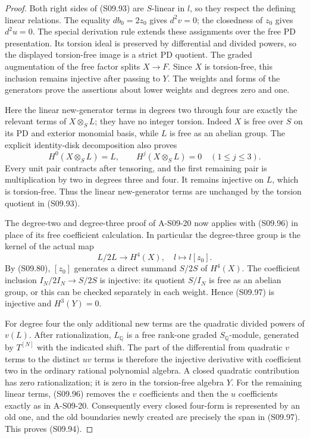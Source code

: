 \begin{proof}
Both right sides of (S09.93) are $S$-linear in $l$,
so they respect the defining linear relations.
The equality $db_0=2z_0$ gives $d^2v=0$; the
closedness of $z_0$ gives $d^2u=0$.
The special derivation rule extends these assignments
over the free PD presentation.  Its torsion ideal
is preserved by differential and divided powers,
so the displayed torsion-free image is a strict
PD quotient.  The graded augmentation of the
free factor splits $X\to F$.  Since $X$ is
torsion-free, this inclusion remains injective
after passing to $Y$.  The weights and forms of
the generators prove the assertions about lower
weights and degrees zero and one.

Here the linear new-generator terms in degrees
two through four are exactly the relevant terms
of $X\otimes_S L$; they have no integer torsion.
Indeed $X$ is free over $S$ on its PD and exterior
monomial basis, while $L$ is free as an abelian
group.  The explicit identity-disk decomposition
also proves
\[
 H^0(X\otimes_S L)=L,
 \qquad H^j(X\otimes_S L)=0\quad(1\leq j\leq3).
 \tag{S09.96}
\]
Every unit pair contracts after tensoring, and
the first remaining pair is multiplication by
two in degrees three and four.  It remains
injective on $L$, which is torsion-free.
Thus the linear new-generator terms are unchanged
by the torsion quotient in (S09.93).

The degree-two and degree-three proof of A-S09-20
now applies with (S09.96) in place of its free
coefficient calculation.  In particular the
degree-three group is the kernel of the actual
map
\[
                      L/2L\longrightarrow H^4(X),
                                     \quad l\longmapsto l[z_0].
 \tag{S09.97}
\]
By (S09.80), $[z_0]$ generates a direct summand
$S/2S$ of $H^4(X)$.  The coefficient inclusion
$I_N/2I_N\to S/2S$ is injective: its quotient
$S/I_N$ is free as an abelian group, or this can
be checked separately in each weight.  Hence
(S09.97) is injective and $H^3(Y)=0$.

For degree four the only additional new terms
are the quadratic divided powers of $v(L)$.
After rationalization, $L_{\mathbb Q}$ is a free
rank-one graded $S_{\mathbb Q}$-module, generated
by $T^{[N]}$ with the indicated shift.  The part
of the differential from quadratic $v$ terms
to the distinct $uv$ terms is therefore the
injective derivative with coefficient two in
the ordinary rational polynomial algebra.
A closed quadratic contribution has zero
rationalization; it is zero in the torsion-free
algebra $Y$.  For the remaining linear terms,
(S09.96) removes the $v$ coefficients and then
the $u$ coefficients exactly as in A-S09-20.
Consequently every closed four-form is represented
by an old one, and the old boundaries newly
created are precisely the span in (S09.97).
This proves (S09.94).


\end{proof}
